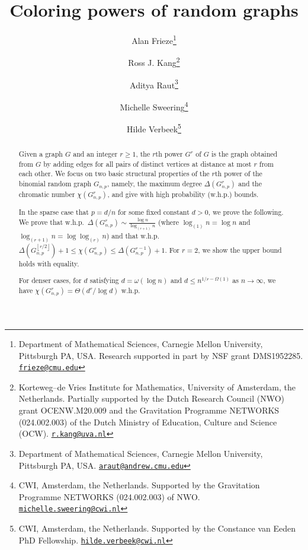 \documentclass[12pt,a4paper]{article}
\newcommand{\rdown}[1]{{\left\lfloor #1\right \rfloor}}
\theoremstyle{plain}
\begin{document}
	
\author{
Alan Frieze\thanks{Department of Mathematical Sciences, Carnegie Mellon University, Pittsburgh PA, USA. Research supported in part by NSF grant DMS1952285. \protect\href{mailto:frieze@cmu.edu}{\protect\nolinkurl{frieze@cmu.edu}}}
\and
Ross J. Kang\thanks{Korteweg--de Vries Institute for Mathematics, University of Amsterdam, the Netherlands. Partially supported by the Dutch Research Council (NWO) grant OCENW.M20.009 and the Gravitation Programme NETWORKS (024.002.003) of the Dutch Ministry of Education, Culture and Science (OCW).  \protect\href{mailto:r.kang@uva.nl}{\protect\nolinkurl{r.kang@uva.nl}}}
\and
Aditya Raut\thanks{Department of Mathematical Sciences, Carnegie Mellon University, Pittsburgh PA, USA. \protect\href{mailto:araut@andrew.cmu.edu}{\protect\nolinkurl{araut@andrew.cmu.edu}}}
\and
Michelle Sweering\thanks{CWI, Amsterdam, the Netherlands. Supported by the Gravitation Programme NETWORKS (024.002.003) of NWO.  \protect\href{mailto:michelle.sweering@cwi.nl}{\protect\nolinkurl{michelle.sweering@cwi.nl}}}
\and
Hilde Verbeek\thanks{CWI, Amsterdam, the Netherlands. Supported by the Constance van Eeden PhD
Fellowship. \protect\href{mailto:hilde.verbeek@cwi.nl}{\protect\nolinkurl{hilde.verbeek@cwi.nl}}}
}

\date{}
\title{Coloring powers of random graphs}
\maketitle

\begin{abstract}
Given a graph $G$ and an integer $r\ge 1$, the $r$th power $G^r$ of $G$ is the graph obtained from $G$ by adding edges for all pairs of distinct vertices at distance at most $r$ from each other.
We focus on two basic structural properties of the $r$th power of the binomial random graph $G_{n,p}$, namely, the maximum degree $\Delta(G_{n,p}^r)$ and the chromatic number $\chi(G_{n,p}^r)$, and give with high probability (w.h.p.) bounds.

In the sparse case that $p=d/n$ for some fixed constant $d>0$, we prove the following.
We prove that w.h.p.~$\Delta(G_{n,p}^r) \sim \frac{\log n}{\log_{(r+1)}n}$ (where $\log_{(1)}n=\log n$ and $\log_{(r+1)}n=\log\log_{(r)}n$) and that w.h.p.~$\Delta(G_{n,p}^{\rdown{r/2}})+1 \le \chi(G_{n,p}^r) \le \Delta(G_{n,p}^{r-1})+1$. For $r=2$, we show the upper bound holds with equality.

For denser cases,
for $d$ satisfying $d=\omega(\log n)$ and $d\le n^{1/r-\Omega(1)}$ as $n\to\infty$, we have $\chi(G_{n,p}^r) = \Theta(d^r/\log d)$ w.h.p.
\end{abstract} 
\end{document}
